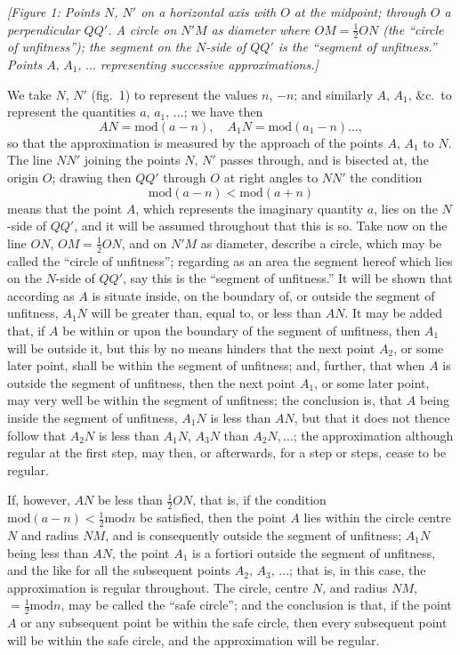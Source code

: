 \documentclass[11pt]{article}
\providecommand{\modd}{\mathrm{mod}}
\begin{document}
\begin{center}
\textit{[Figure 1: Points $N$, $N'$ on a horizontal axis with $O$ at the midpoint;
through $O$ a perpendicular $QQ'$. A circle on $N'M$ as diameter where
$OM = \tfrac{1}{2}ON$ (the ``circle of unfitness''); the segment on the $N$-side of $QQ'$
is the ``segment of unfitness.'' Points $A,\,A_1,\,\ldots$ representing successive
approximations.]}
\end{center}

We take $N$, $N'$ (fig.\ 1) to represent the values $n$, $-n$; and similarly $A,\,A_1,\,\&$c.\
to represent the quantities $a,\,a_1,\,\ldots$; we have then
\[
   AN = \modd(a - n),\quad A_1 N = \modd(a_1 - n)\ldots,
\]
so that the approximation is measured by the approach of the points $A,\,A_1$ to $N$.
The line $NN'$ joining the points $N,\,N'$ passes through, and is bisected at, the origin
$O$; drawing then $QQ'$ through $O$ at right angles to $NN'$ the condition
\[
   \modd(a - n) < \modd(a + n)
\]
means that the point $A$, which represents the imaginary quantity $a$, lies on the
$N$-side of $QQ'$, and it will be assumed throughout that this is so. Take now on the
line $ON$, $OM = \tfrac{1}{2}ON$, and on $N'M$ as diameter, describe a circle, which may be called
the ``circle of unfitness''; regarding as an area the segment hereof which lies on
the $N$-side of $QQ'$, say this is the ``segment of unfitness.'' It will be shown that
according as $A$ is situate inside, on the boundary of, or outside the segment of
unfitness, $A_1 N$ will be greater than, equal to, or less than $AN$. It may be added
that, if $A$ be within or upon the boundary of the segment of unfitness, then $A_1$
will be outside it, but this by no means hinders that the next point $A_2$, or some
later point, shall be within the segment of unfitness; and, further, that when $A$ is
outside the segment of unfitness, then the next point $A_1$, or some later point, may
very well be within the segment of unfitness; the conclusion is, that $A$ being inside
the segment of unfitness, $A_1 N$ is less than $AN$, but that it does not thence follow
that $A_2 N$ is less than $A_1 N$, $A_3 N$ than $A_2 N$,$\,\ldots$; the approximation although regular
at the first step, may then, or afterwards, for a step or steps, cease to be regular.

If, however, $AN$ be less than $\tfrac{1}{2} ON$, that is, if the condition $\modd(a - n) < \tfrac{1}{2}\modd n$
be satisfied, then the point $A$ lies within the circle centre $N$ and radius $NM$, and
is consequently outside the segment of unfitness; $A_1 N$ being less than $AN$, the point
$A_1$ is a fortiori outside the segment of unfitness, and the like for all the subsequent
points $A_2,\,A_3,\,\ldots$; that is, in this case, the approximation is regular throughout. The
circle, centre $N$, and radius $NM$, $=\tfrac{1}{2}\modd n$, may be called the ``safe circle''; and
the conclusion is that, if the point $A$ or any subsequent point be within the safe
circle, then every subsequent point will be within the safe circle, and the approximation
will be regular.
\end{document}
